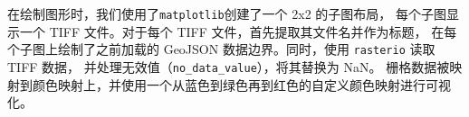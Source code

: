 \documentclass[AutoFakeBold]{LZUThesis-PgD&PhD}
\begin{document}
	在绘制图形时，我们使用了\texttt{matplotlib}创建了一个 2x2 的子图布局，
	每个子图显示一个 TIFF 文件。对于每个 TIFF 文件，首先提取其文件名并作为标题，
	在每个子图上绘制了之前加载的 GeoJSON 数据边界。同时，使用 \texttt{rasterio} \cite{rasterio} 读取 TIFF 数据，
	并处理无效值（\texttt{no\_data\_value}），将其替换为 NaN。
	栅格数据被映射到颜色映射上，并使用一个从蓝色到绿色再到红色的自定义颜色映射进行可视化。
	
	
	
	
	
	
%		
%		
	
	
%		
	
%		
%		
	
\end{document}
